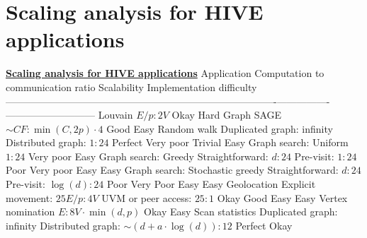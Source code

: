 \documentclass[10pt,oneside]{memoir}
\begin{document}
\hypertarget{scaling-analysis-for-hive-applications}{%
\section{Scaling analysis for HIVE
applications}\label{scaling-analysis-for-hive-applications}}

\textbf{\href{https://gunrock.github.io/docs/hive_scaling.html}{Scaling
analysis for HIVE applications}} \textbar{} Application \textbar{}
Computation to communication ratio \textbar{} Scalability \textbar{}
Implementation difficulty \textbar{}
\textbar{}---------------------------------\textbar{}-------------------------------------------------\textbar{}----------------\textbar{}---------------------------\textbar{}
\textbar{} Louvain \textbar{} \(E/p : 2V\) \textbar{} Okay \textbar{}
Hard \textbar{} \textbar{} Graph SAGE \textbar{}
\(\sim CF : \min(C, 2p) \cdot 4\) \textbar{} Good \textbar{} Easy
\textbar{} \textbar{} Random walk \textbar{} Duplicated graph: infinity
\linebreak Distributed graph: \(1 : 24\) \textbar{} Perfect
\linebreak Very poor \textbar{} Trivial \linebreak Easy \textbar{}
\textbar{} Graph search: Uniform \textbar{} \(1 : 24\) \textbar{} Very
poor \textbar{} Easy \textbar{} \textbar{} Graph search: Greedy
\textbar{} Straightforward: \(d : 24\) \linebreak Pre-visit: \(1:24\)
\textbar{} Poor \linebreak Very poor \textbar{} Easy \linebreak Easy
\textbar{} \textbar{} Graph search: Stochastic greedy \textbar{}
Straightforward: \(d : 24\) \linebreak Pre-visit: \(\log(d) : 24\)
\textbar{} Poor \linebreak Very Poor \textbar{} Easy \linebreak Easy
\textbar{} \textbar{} Geolocation \textbar{} Explicit movement:
\(25E/p : 4V\) \linebreak UVM or peer access: \(25 : 1\) \textbar{} Okay
\linebreak Good \textbar{} Easy \linebreak Easy \textbar{} \textbar{}
Vertex nomination \textbar{} \(E : 8V \cdot \min(d, p)\) \textbar{} Okay
\textbar{} Easy \textbar{} \textbar{} Scan statistics \textbar{}
Duplicated graph: infinity \linebreak Distributed graph:
\(\sim(d+a \cdot \log(d)):12\) \textbar{} Perfect \linebreak Okay
\end{document}
